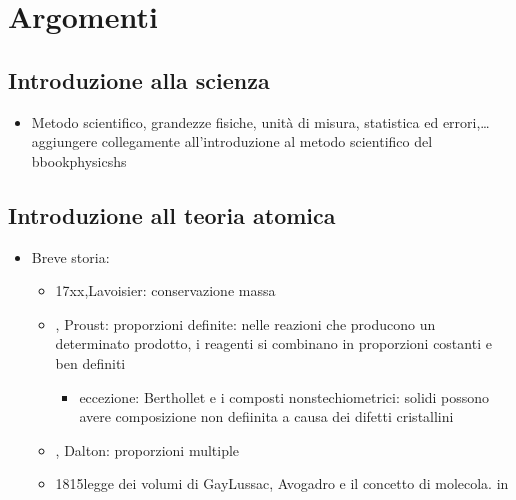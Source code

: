 \documentclass[letterpaper,10pt,english]{jupyterBook}
\begin{document}
\sphinxstepscope


\chapter{Argomenti}
\label{\detokenize{ch/units:argomenti}}\label{\detokenize{ch/units:book-chemistry-hs-topics}}\label{\detokenize{ch/units::doc}}

\section{Introduzione alla scienza}
\label{\detokenize{ch/units:introduzione-alla-scienza}}\begin{itemize}
\item {} 
\sphinxAtStartPar
Metodo scientifico, grandezze fisiche, unità di misura, statistica ed errori,…
 aggiungere collegamente all’introduzione al metodo scientifico del bbook\sphinxhyphen{}physics\sphinxhyphen{}hs

\end{itemize}


\section{Introduzione all teoria atomica}
\label{\detokenize{ch/units:introduzione-all-teoria-atomica}}\begin{itemize}
\item {} 
\sphinxAtStartPar
Breve storia:
\begin{itemize}
\item {} 
\sphinxAtStartPar
17xx,Lavoisier: conservazione massa

\item {} 
, Proust: proporzioni definite: nelle reazioni che producono un determinato prodotto, i reagenti si combinano in proporzioni costanti e ben definiti
\begin{itemize}
\item {} 
\sphinxAtStartPar
eccezione: Berthollet e i composti non\sphinxhyphen{}stechiometrici: solidi possono avere composizione non defiinita a causa dei difetti cristallini

\end{itemize}

\item {} 
, Dalton: proporzioni multiple

\item {} 
\sphinxhyphen{}1815legge dei volumi di Gay\sphinxhyphen{}Lussac, Avogadro e il concetto di molecola. in 

\end{itemize}

\end{itemize}
\end{document}
